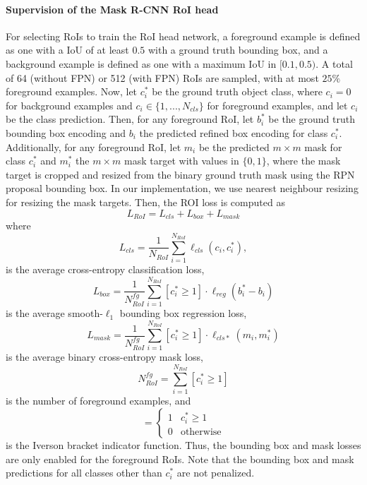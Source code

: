 \paragraph{Supervision of the Mask R-CNN RoI head}
For selecting RoIs to train the RoI head network, a foreground example
is defined as one with a IoU of at least $0.5$ with
a ground truth bounding box, and a background example is defined as
one with a maximum IoU in $[0.1, 0.5)$.
A total of 64 (without FPN) or 512 (with FPN) RoIs are sampled, with
at most $25\%$ foreground examples.
Now, let $c_i^*$ be the ground truth object class, where $c_i = 0$
for background examples and $c_i \in \{1, ..., N_{cls}\}$ for foreground examples,
and let $c_i$ be the class prediction.
Then, for any foreground RoI, let $b_i^*$ be the ground truth bounding box encoding and $b_i$
the predicted refined box encoding for class $c_i^*$.
Additionally, for any foreground RoI, let $m_i$ be the predicted $m \times m$ mask for class $c_i^*$
and $m_i^*$ the $m \times m$ mask target with values in $\{0,1\}$, where the mask target is cropped and resized from
the binary ground truth mask using the RPN proposal bounding box.
In our implementation, we use nearest neighbour resizing for resizing the mask
targets.
Then, the ROI loss is computed as
\begin{equation}
L_{RoI} = L_{cls} + L_{box} + L_{mask}
\end{equation}
where
\begin{equation}
L_{cls} = \frac{1}{N_{RoI}} \sum_{i=1}^{N_{RoI}} \ell_{cls}(c_i, c_i^*),
\end{equation}
is the average cross-entropy classification loss,
\begin{equation}
L_{box} = \frac{1}{N_{RoI}^{fg}} \sum_{i=1}^{N_{RoI}} [c_i^* \geq 1] \cdot \ell_{reg}(b_i^* - b_i)
\end{equation}
is the average smooth-$\ell_1$ bounding box regression loss,
\begin{equation}
L_{mask} = \frac{1}{N_{RoI}^{fg}} \sum_{i=1}^{N_{RoI}} [c_i^* \geq 1] \cdot \ell_{cls*}(m_i,m_i^*)
\end{equation}
is the average binary cross-entropy mask loss,
\begin{equation}
N_{RoI}^{fg} = \sum_{i=1}^{N_{RoI}} [c_i^* \geq 1]
\end{equation}
is the number of foreground examples, and
\begin{equation}
[c_i^* \geq 1] =
\begin{cases}
1 &\text{$c_i^* \geq 1$} \\
0 &\text{otherwise}
\end{cases}
\end{equation}
is the Iverson bracket indicator function. Thus, the bounding box and mask
losses are only enabled for the foreground RoIs. Note that the bounding box and mask predictions
for all classes other than $c_i^*$ are not penalized.

